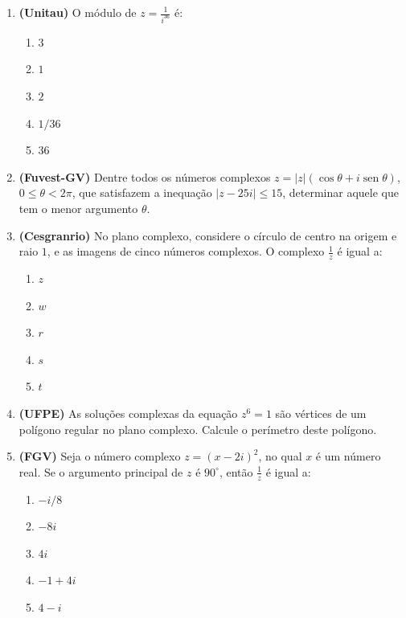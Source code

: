 \documentclass[12pt,a4paper]{article}
\begin{document}
\begin{enumerate}[label=\textbf{\arabic*.}, leftmargin=*, itemsep=1.2em]
\newpage

    \item \textbf{(Unitau)} O módulo de $z = \frac{1}{i^{36}}$ é:
    \begin{enumerate}[label=\alph*)]
        \item $3$
        \item $1$
        \item $2$
        \item $1/36$
        \item $36$
    \end{enumerate}

    \item \textbf{(Fuvest-GV)} Dentre todos os números complexos $z = |z|(\cos\theta + i\operatorname{sen}\theta)$, $0 \le \theta < 2\pi$, que satisfazem a inequação $|z - 25i| \le 15$, determinar aquele que tem o menor argumento $\theta$.

    \item \textbf{(Cesgranrio)} No plano complexo, considere o círculo de centro na origem e raio $1$, e as imagens de cinco números complexos. O complexo $\frac{1}{z}$ é igual a:
    \begin{enumerate}[label=\alph*)]
        \item $z$
        \item $w$
        \item $r$
        \item $s$
        \item $t$
    \end{enumerate}

    \item \textbf{(UFPE)} As soluções complexas da equação $z^6 = 1$ são vértices de um polígono regular no plano complexo. Calcule o perímetro deste polígono.

    \item \textbf{(FGV)} Seja o número complexo $z = (x - 2i)^2$, no qual $x$ é um número real. Se o argumento principal de $z$ é $90^\circ$, então $\frac{1}{z}$ é igual a:
    \begin{enumerate}[label=\alph*)]
        \item $-i/8$
        \item $-8i$
        \item $4i$
        \item $-1 + 4i$
        \item $4 - i$
    \end{enumerate}


\end{enumerate}
\end{document}
